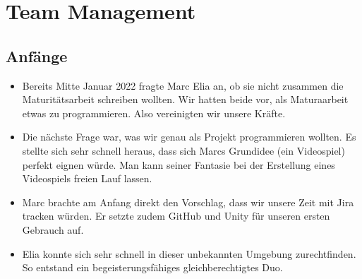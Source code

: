 \chapter{Team Management}

\section{Anfänge}
\begin{itemize}
    \item Bereits Mitte Januar 2022 fragte Marc Elia an, ob sie nicht zusammen die Maturitätsarbeit schreiben wollten. Wir hatten beide vor, als Maturaarbeit etwas zu programmieren. Also vereinigten wir unsere Kräfte.
    \item Die nächste Frage war, was wir genau als Projekt programmieren wollten. Es stellte sich sehr schnell heraus, dass sich Marcs Grundidee (ein Videospiel) perfekt eignen würde. Man kann seiner Fantasie bei der Erstellung eines Videospiels
    freien Lauf lassen.
    \item Marc brachte am Anfang direkt den Vorschlag, dass wir unsere Zeit mit Jira tracken würden. Er setzte zudem GitHub und Unity für unseren ersten Gebrauch auf. 
    \item Elia konnte sich sehr schnell in dieser unbekannten Umgebung zurechtfinden. So entstand ein begeisterungsfähiges gleichberechtigtes Duo.
\end{itemize}

